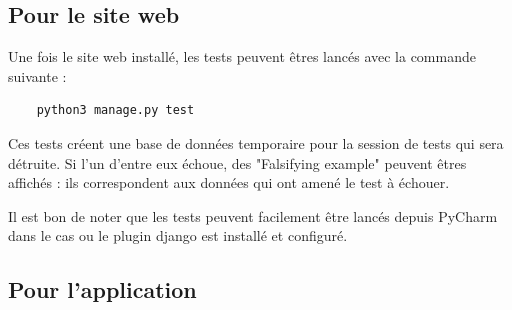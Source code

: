 \subsection{Pour le site web}

Une fois le site web installé, les tests peuvent êtres lancés avec la commande suivante :


\begin{verbatim}
    python3 manage.py test
\end{verbatim}

Ces tests créent une base de données temporaire pour la session de tests qui sera détruite. Si l'un d'entre eux échoue, des "Falsifying example" peuvent êtres affichés : ils correspondent aux données qui ont amené le test à échouer.

Il est bon de noter que les tests peuvent facilement être lancés depuis PyCharm dans le cas ou le plugin \Gls{django} est installé et configuré.

\subsection{Pour l'application}

